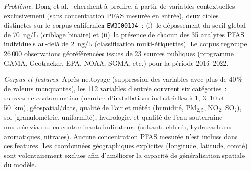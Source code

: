\emph{Probl\`eme.}
Dong et al.~\cite{dong2024pfas} cherchent \`a pr\'edire, \`a partir de variables contextuelles exclusivement (sans concentration PFAS mesur\'ee en entr\'ee), deux cibles distinctes sur le corpus californien \texttt{EW3C00134}~: (i)~le d\'epassement du seuil global de 70~ng/L (criblage binaire) et (ii)~la pr\'esence de chacun des 35 analytes PFAS individuels au-del\`a de 2~ng/L (classification multi-\'etiquettes).
Le corpus regroupe 26\,000 observations g\'eor\'ef\'erenc\'ees issues de 23 sources publiques (programme GAMA, Geotracker, EPA, NOAA, SGMA, etc.) pour la p\'eriode 2016--2022.

\emph{Corpus et features.}
Apr\`es nettoyage (suppression des variables avec plus de 40\,\% de valeurs manquantes), les 112 variables d'entr\'ee couvrent six cat\'egories~: sources de contamination (nombre d'installations industrielles \`a 1, 3, 10 et 50~km), g\'eospatial/date, qualit\'e de l'air et m\'et\'eo (humidit\'e, PM$_{2,5}$, NO$_2$, SO$_2$), sol (granulom\'etrie, uniformit\'e), hydrologie, et qualit\'e de l'eau souterraine mesur\'ee via des co-contaminants indicateurs (solvants chlor\'es, hydrocarbures aromatiques, nitrates).
Aucune concentration PFAS mesur\'ee n'est incluse dans ces features.
Les coordonn\'ees g\'eographiques explicites (longitude, latitude, comt\'e) sont volontairement exclues afin d'am\'eliorer la capacit\'e de g\'en\'eralisation spatiale du mod\`ele.

